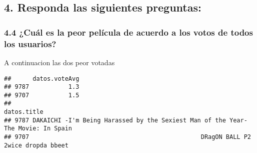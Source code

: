 \documentclass[
]{article}
\newenvironment{Shaded}{\begin{snugshade}}{\end{snugshade}}
\newcommand{\CommentTok}[1]{\textcolor[rgb]{0.56,0.35,0.01}{\textit{#1}}}
\newcommand{\DecValTok}[1]{\textcolor[rgb]{0.00,0.00,0.81}{#1}}
\newcommand{\FunctionTok}[1]{\textcolor[rgb]{0.00,0.00,0.00}{#1}}
\newcommand{\NormalTok}[1]{#1}
\newcommand{\OtherTok}[1]{\textcolor[rgb]{0.56,0.35,0.01}{#1}}
\newcommand{\SpecialCharTok}[1]{\textcolor[rgb]{0.00,0.00,0.00}{#1}}
\begin{document}
\begin{Shaded}
\end{Shaded}

\hypertarget{responda-las-siguientes-preguntas}{%
\subsection{4. Responda las siguientes
preguntas:}\label{responda-las-siguientes-preguntas}}

\hypertarget{cuuxe1l-es-la-peor-peluxedcula-de-acuerdo-a-los-votos-de-todos-los-usuarios}{%
\subsubsection{4.4 ¿Cuál es la peor película de acuerdo a los votos de
todos los
usuarios?}\label{cuuxe1l-es-la-peor-peluxedcula-de-acuerdo-a-los-votos-de-todos-los-usuarios}}

A continuacion las dos peor votadas

\begin{Shaded}
\end{Shaded}

\begin{verbatim}
##      datos.voteAvg
## 9787           1.3
## 9707           1.5
##                                                                           datos.title
## 9787 DAKAICHI -I'm Being Harassed by the Sexiest Man of the Year- The Movie: In Spain
## 9707                                                DRagON BALL P2 2wice dropda bbeet
\end{verbatim}
\end{document}
